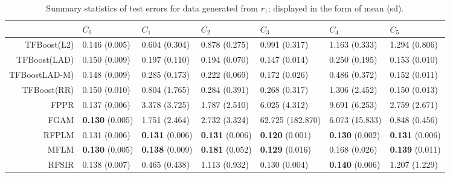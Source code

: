 \renewcommand{\arraystretch}{1.5}
\addtolength{\tabcolsep}{-3pt}    
\begin{table}[H]
\footnotesize
\centering
\begin{tabular}{rllllll}
  \hline
 & $C_0$ & $C_1$ & $C_2$ & $C_3$ & $C_4$ & $C_5$ \\ 
  \hline
TFBoost(L2) & 0.146 (0.005) & 0.604 (0.304) & 0.878 (0.275) & 0.991 (0.317) & 1.163 (0.333) & 1.294 (0.806) \\ 
  TFBoost(LAD) & 0.150 (0.009) & 0.197 (0.110) & 0.194 (0.070) & 0.147 (0.014) & 0.250 (0.195) & 0.153 (0.010) \\ 
  TFBoostLAD-M) & 0.148 (0.009) & 0.285 (0.173) & 0.222 (0.069) & 0.172 (0.026) & 0.486 (0.372) & 0.152 (0.011) \\ 
  TFBoost(RR) & 0.150 (0.010) & 0.804 (1.765) & 0.284 (0.391) & 0.268 (0.317) & 1.306 (2.452) & 0.150 (0.013) \\ 
  FPPR & 0.137 (0.006) & 3.378 (3.725) & 1.787 (2.510) & 6.025 (4.312) & 9.691 (6.253) & 2.759 (2.671) \\ 
  FGAM & \textbf{0.130} (0.005) & 1.751 (2.464) & 2.732 (3.324) & 62.725 (182.870) & 6.073 (15.833) & 0.848 (0.456) \\ 
  RFPLM & 0.131 (0.006) & \textbf{0.131} (0.006) & \textbf{0.131} (0.006) & \textbf{0.120} (0.001) & \textbf{0.130} (0.002) & \textbf{0.131} (0.006) \\ 
  MFLM & \textbf{0.130} (0.005) & \textbf{0.138} (0.009) & \textbf{0.181} (0.052) & \textbf{0.129} (0.016) & 0.168 (0.026) & \textbf{0.139} (0.011) \\ 
  RFSIR & 0.138 (0.007) & 0.465 (0.438) & 1.113 (0.932) & 0.130 (0.004) & \textbf{0.140} (0.006) & 1.207 (1.229) \\ 
   \hline
\end{tabular}
\caption{Summary statistics of test errors for data generated from $r_1$; displayed in the form of mean (sd).} 
\end{table}
